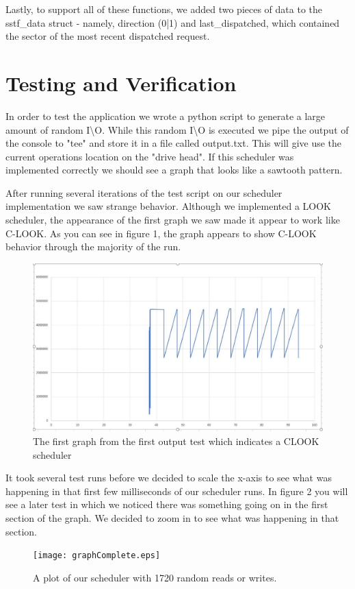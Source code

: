 \documentclass[letterpaper,10pt,draftclsnofoot,onecolumn]{IEEEtran}
\begin{document}
Lastly, to support all of these functions, we added two pieces of data to the sstf\_data struct - namely, direction (0|1) and last\_dispatched, which contained the sector of the most recent dispatched request. 

\section{Testing and Verification}

In order to test the application  we wrote a python script to generate a large amount of random I\textbackslash O. While this random I\textbackslash O is executed we pipe the output of the console to "tee" and store it in a file called output.txt. This will give use the current operations location on the "drive head". If this scheduler was implemented correctly we should see a graph that looks like a sawtooth pattern. 

After running several iterations of the test script on our scheduler implementation we saw strange behavior. Although we implemented a LOOK scheduler, the appearance of the first graph we saw made it appear to work like C-LOOK. As you can see in figure 1, the graph appears to show C-LOOK behavior through the majority of the run. 

\begin{figure}[!ht]
  \centering
  \includegraphics[width=1.0\textwidth]{CLOOK-Graph.eps}
  \centering
  \caption{The first graph from the first output test which indicates a CLOOK scheduler}
\end{figure}

It took several test runs before we decided to scale the x-axis to see what was happening in that first few milliseconds of our scheduler runs. In figure 2 you will see a later test in which we noticed there was something going on in the first section of the graph. We decided to zoom in to see what was happening in that section. 
\begin{figure}[!ht]
  \centering
  \texttt{[image: graphComplete.eps]}
  \centering
  \caption{A plot of our scheduler with 1720 random reads or writes.}
\end{figure}
\end{document}
